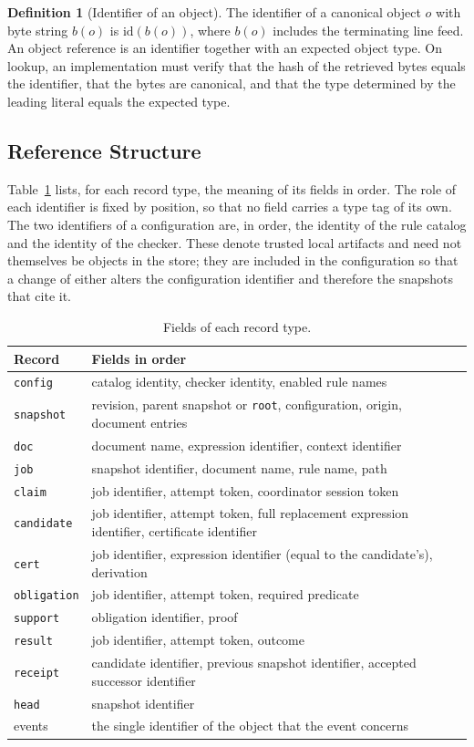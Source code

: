 \documentclass[11pt,a4paper]{article}
\theoremstyle{plain}
\theoremstyle{definition}
\newtheorem{definition}[theorem]{Definition}
\theoremstyle{remark}
\theoremstyle{definition}
\newcommand{\code}[1]{\texttt{#1}}
\newcommand{\hid}{\mathrm{id}}
\begin{document}
\begin{definition}[Identifier of an object]
The identifier of a canonical object $o$ with byte string $b(o)$ is $\hid(b(o))$, where $b(o)$ includes the terminating line feed. An object reference is an identifier together with an expected object type. On lookup, an implementation must verify that the hash of the retrieved bytes equals the identifier, that the bytes are canonical, and that the type determined by the leading literal equals the expected type.
\end{definition}

\subsection{Reference Structure}

Table~\ref{tab:records} lists, for each record type, the meaning of its fields in order. The role of each identifier is fixed by position, so that no field carries a type tag of its own. The two identifiers of a configuration are, in order, the identity of the rule catalog and the identity of the checker. These denote trusted local artifacts and need not themselves be objects in the store; they are included in the configuration so that a change of either alters the configuration identifier and therefore the snapshots that cite it.

\begin{table}[t]
\centering\small
\begin{tabular}{@{}lp{9.6cm}@{}}
\toprule
Record & Fields in order \\
\midrule
\code{config} & catalog identity, checker identity, enabled rule names \\
\code{snapshot} & revision, parent snapshot or \code{root}, configuration, origin, document entries \\
\code{doc} & document name, expression identifier, context identifier \\
\code{job} & snapshot identifier, document name, rule name, path \\
\code{claim} & job identifier, attempt token, coordinator session token \\
\code{candidate} & job identifier, attempt token, full replacement expression identifier, certificate identifier \\
\code{cert} & job identifier, expression identifier (equal to the candidate's), derivation \\
\code{obligation} & job identifier, attempt token, required predicate \\
\code{support} & obligation identifier, proof \\
\code{result} & job identifier, attempt token, outcome \\
\code{receipt} & candidate identifier, previous snapshot identifier, accepted successor identifier \\
\code{head} & snapshot identifier \\
events & the single identifier of the object that the event concerns \\
\bottomrule
\end{tabular}
\caption{Fields of each record type.}
\label{tab:records}
\end{table}
\end{document}
